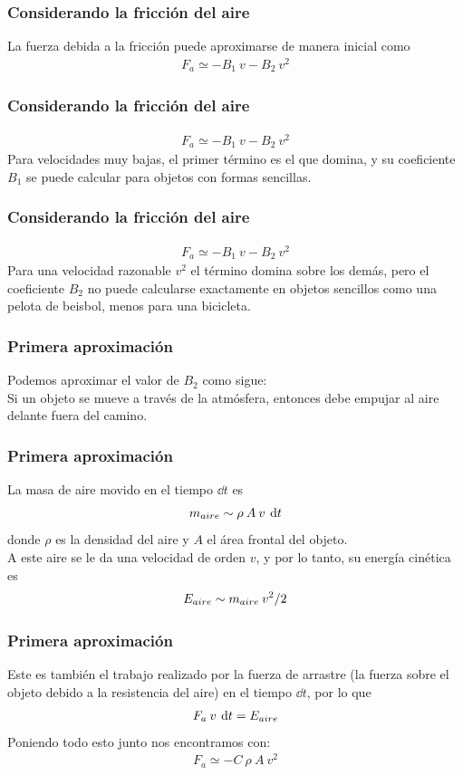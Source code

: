 \begin{frame}
\frametitle{Considerando la fricción del aire}
La fuerza debida a la fricción puede aproximarse de manera inicial como
\begin{align}
F_{a} \simeq - B_{1} \: v - B_{2} \: v^{2}
\label{EqFfriccion}
\end{align}
\end{frame}
\begin{frame}
\frametitle{Considerando la fricción del aire}
\begin{align*}
F_{a} \simeq - B_{1} \: v - B_{2} \: v^{2}
\end{align*}
Para velocidades muy bajas, el primer término es el que domina, y su coeficiente $B_{1}$ se puede calcular para objetos con formas sencillas.
\end{frame}
\begin{frame}
\frametitle{Considerando la fricción del aire}
\begin{align*}
F_{a} \simeq - B_{1} \: v - B_{2} \: v^{2}
\end{align*}
Para una velocidad razonable $v^{2}$ el término domina sobre los demás, pero el coeficiente $B_{2}$ no puede calcularse exactamente en objetos sencillos como una pelota de beisbol, menos para una bicicleta.
\end{frame}
\begin{frame}
\frametitle{Primera aproximación}
Podemos aproximar el valor de $B_{2}$ como sigue:
\\
\medskip
\pause
Si un objeto se mueve a través de la atmósfera, entonces debe empujar al aire delante fuera del camino.
\end{frame}
\begin{frame}
\frametitle{Primera aproximación}
La masa de aire movido en el tiempo $\dd{t}$ es
\begin{align*}
m_{\tiny{aire}} \sim \rho \: A \: v \: \dd{t}
\end{align*}
donde $\rho$ es la densidad del aire y $A$ el área frontal del objeto. 
\\
\bigskip
\pause
A este aire se le da una velocidad de orden $v$, y por lo tanto, su energía cinética es
\begin{align*}
E_{\tiny{aire}} \sim m_{aire} \: v^{2} /2
\end{align*}
\end{frame}
\begin{frame}
\frametitle{Primera aproximación}
Este es también el trabajo realizado por la fuerza de arrastre (la fuerza sobre el objeto debido a la resistencia del aire) en el tiempo $\dd{t}$, por lo que
\begin{align*}
F_{a} \: v \: \dd{t} = E_{\tiny{aire}}
\end{align*}
\bigskip
\pause
Poniendo todo esto junto nos encontramos con:
\begin{align*}
F_{a} \simeq - C \: \rho \: A \: v^{2}
\end{align*}
\end{frame}
